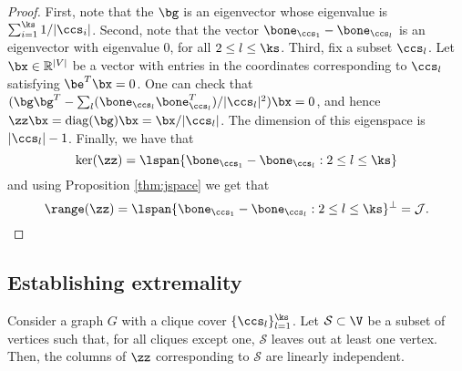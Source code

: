 \begin{proof}
First, note that the $\bg$ is an eigenvector whose eigenvalue is $\sum_{i=1}^{\ks} 1/|\ccs_i|$.  Second, note that the vector $\bone_{\ccs_1} - \bone_{\ccs_l} $ is an eigenvector with eigenvalue $0$, for all $2 \leq l \leq \ks$.  Third, fix a subset $\ccs_l$.  Let $\bx \in \mathbb{R}^{|V|}$ be a vector with entries in the coordinates corresponding to $\ccs_l$ satisfying $\be^T \bx = 0$.  One can check that $(\bg\bg^T - \sum_{l} (\bone_{\ccs_l}\bone_{\ccs_l}^T)/|\ccs_l|^2) \bx = 0$, and hence $\zz\bx = \mathrm{diag}(\bg) \bx = \bx / |\ccs_l|$.  The dimension of this eigenspace is $|\ccs_l|-1$.  Finally, we have that 
$$\ker(\zz)=\lspan\{\bone_{\ccs_1} - \bone_{\ccs_l}:  2\le l\le \ks \}$$
and using Proposition \ref{thm:jspace} we get that 
$$\range(\zz)=\lspan\{\bone_{\ccs_1} - \bone_{\ccs_l}:  2\le l\le \ks \}^\perp=\mathcal{J}.$$

\end{proof}

\subsection{Establishing extremality}

\begin{lemma} \label{thm:non_degen_Z} Consider  a graph $G$ with a  clique cover $\{\ccs_l\}_{l=1}^{\ks}$.  Let $\mathcal{S} \subset \V$ be a subset of vertices such that, for all cliques except one, $ \mathcal{S}$ leaves out at least one vertex.  Then, the columns of $\zz$ corresponding to $\mathcal{S}$ are linearly independent.
\end{lemma}

